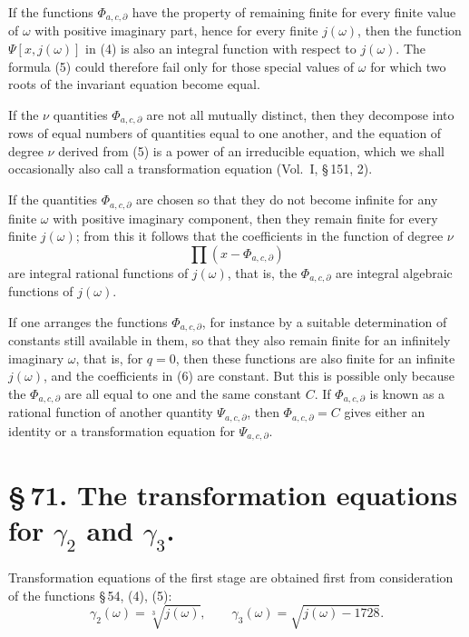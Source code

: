 \documentclass[11pt]{article}
\begin{document}
If the functions $\Phi_{a,c,\partial}$ have the property of remaining finite for every finite value of $\omega$ with positive imaginary part, hence for every finite $j(\omega)$, then the function $\Psi[x,j(\omega)]$ in (4) is also an integral function with respect to $j(\omega)$. The formula (5) could therefore fail only for those special values of $\omega$ for which two roots of the invariant equation become equal.

If the $\nu$ quantities $\Phi_{a,c,\partial}$ are not all mutually distinct, then they decompose into rows of equal numbers of quantities equal to one another, and the equation of degree $\nu$ derived from (5) is a power of an irreducible equation, which we shall occasionally also call a transformation equation (Vol.~I, \S\,151, 2).

If the quantities $\Phi_{a,c,\partial}$ are chosen so that they do not become infinite for any finite $\omega$ with positive imaginary component, then they remain finite for every finite $j(\omega)$; from this it follows that the coefficients in the function of degree $\nu$
\begin{equation}
 \prod(x-\Phi_{a,c,\partial})
\tag{6}
\end{equation}
are integral rational functions of $j(\omega)$, that is, the $\Phi_{a,c,\partial}$ are integral algebraic functions of $j(\omega)$.

If one arranges the functions $\Phi_{a,c,\partial}$, for instance by a suitable determination of constants still available in them, so that they also remain finite for an infinitely imaginary $\omega$, that is, for $q=0$, then these functions are also finite for an infinite $j(\omega)$, and the coefficients in (6) are constant. But this is possible only because the $\Phi_{a,c,\partial}$ are all equal to one and the same constant $C$. If $\Phi_{a,c,\partial}$ is known as a rational function of another quantity $\Psi_{a,c,\partial}$, then $\Phi_{a,c,\partial}=C$ gives either an identity or a transformation equation for $\Psi_{a,c,\partial}$.

\section*{\S\,71. The transformation equations for $\gamma_2$ and $\gamma_3$.}

Transformation equations of the first stage are obtained first from consideration of the functions \S\,54, (4), (5):
\[
 \gamma_2(\omega)=\sqrt[3]{j(\omega)},\qquad
 \gamma_3(\omega)=\sqrt{j(\omega)-1728}.
\]
\end{document}
